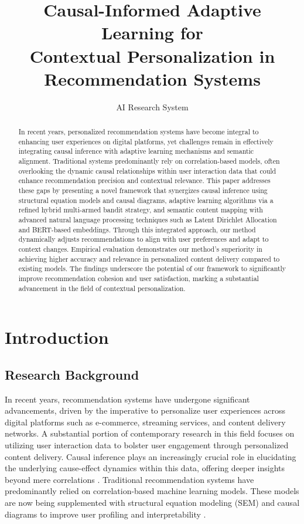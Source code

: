 \documentclass{article} %
\title{Causal-Informed Adaptive Learning for \\Contextual Personalization in \\Recommendation Systems}
\author{AI Research System}
\begin{document}
\maketitle

\begin{abstract}
In recent years, personalized recommendation systems have become integral to enhancing user experiences on digital platforms, yet challenges remain in effectively integrating causal inference with adaptive learning mechanisms and semantic alignment. Traditional systems predominantly rely on correlation-based models, often overlooking the dynamic causal relationships within user interaction data that could enhance recommendation precision and contextual relevance. This paper addresses these gaps by presenting a novel framework that synergizes causal inference using structural equation models and causal diagrams, adaptive learning algorithms via a refined hybrid multi-armed bandit strategy, and semantic content mapping with advanced natural language processing techniques such as Latent Dirichlet Allocation and BERT-based embeddings. Through this integrated approach, our method dynamically adjusts recommendations to align with user preferences and adapt to context changes. Empirical evaluation demonstrates our method's superiority in achieving higher accuracy and relevance in personalized content delivery compared to existing models. The findings underscore the potential of our framework to significantly improve recommendation cohesion and user satisfaction, marking a substantial advancement in the field of contextual personalization.

\end{abstract}


\section{Introduction}

\subsection{Research Background}

In recent years, recommendation systems have undergone significant advancements, driven by the imperative to personalize user experiences across digital platforms such as e-commerce, streaming services, and content delivery networks. A substantial portion of contemporary research in this field focuses on utilizing user interaction data to bolster user engagement through personalized content delivery. Causal inference plays an increasingly crucial role in elucidating the underlying cause-effect dynamics within this data, offering deeper insights beyond mere correlations \citep{Pearl2009Causality}. Traditional recommendation systems have predominantly relied on correlation-based machine learning models. These models are now being supplemented with structural equation modeling (SEM) and causal diagrams to improve user profiling and interpretability \citep{Shmueli2010Explanatory}.
\end{document}
